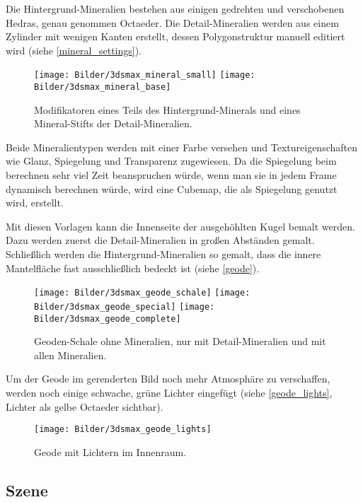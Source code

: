 \documentclass{scrreprt}
\begin{document}
Die Hintergrund-Mineralien bestehen aus einigen gedrehten und verschobenen Hedras, genau genommen Octaeder. Die Detail-Mineralien werden aus einem Zylinder mit wenigen Kanten erstellt, dessen Polygonstruktur manuell editiert wird (siehe \autoref{mineral_settings}).

\begin{figure}[!ht]
\centering
\texttt{[image: Bilder/3dsmax\_mineral\_small]}
\texttt{[image: Bilder/3dsmax\_mineral\_base]}
\caption{Modifikatoren eines Teils des Hintergrund-Minerals und eines Mineral-Stifts der Detail-Mineralien.}
\label{mineral_settings}
\end{figure}

Beide Mineralientypen werden mit einer Farbe versehen und Textureigenschaften wie Glanz, Spiegelung und Transparenz zugewiesen. Da die Spiegelung beim berechnen sehr viel Zeit beanspruchen würde, wenn man sie in jedem Frame dynamisch berechnen würde, wird eine Cubemap, die als Spiegelung genutzt wird, erstellt.

Mit diesen Vorlagen kann die Innenseite der ausgehöhlten Kugel bemalt werden. Dazu werden zuerst die Detail-Mineralien in großen Abständen gemalt. Schließlich werden die Hintergrund-Mineralien so gemalt, dass die innere Mantelfläche fast ausschließlich bedeckt ist (siehe \autoref{geode}).

\begin{figure}[!ht]
\centering
\texttt{[image: Bilder/3dsmax\_geode\_schale]}
\texttt{[image: Bilder/3dsmax\_geode\_special]}
\texttt{[image: Bilder/3dsmax\_geode\_complete]}
\caption{Geoden-Schale ohne Mineralien, nur mit Detail-Mineralien und mit allen Mineralien.}
\label{geode}
\end{figure}

Um der Geode im gerenderten Bild noch mehr Atmosphäre zu verschaffen, werden noch einige schwache, grüne Lichter eingefügt (siehe \autoref{geode_lights}, Lichter als gelbe Octaeder sichtbar).

\begin{figure}[!ht]
\centering
\texttt{[image: Bilder/3dsmax\_geode\_lights]}
\caption{Geode mit Lichtern im Innenraum.}
\label{geode_lights}
\end{figure}

\subsection{Szene}
\end{document}
